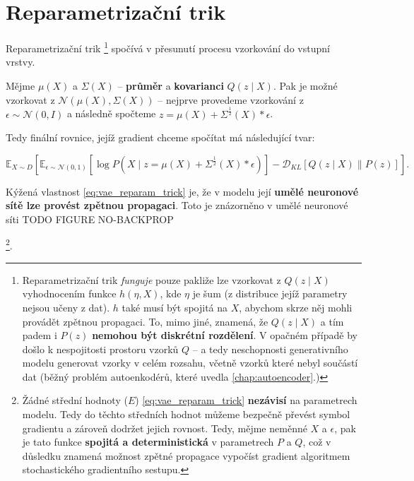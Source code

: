 \section{Reparametrizační trik}
\label{sec:reparametrization_trick}
Reparametrizační trik
\footnote{Reparametrizační trik \emph{funguje} pouze pakliže lze vzorkovat z $Q(z\mid X)$ vyhodnocením funkce $h(\eta, X)$, kde $\eta$ je šum (z distribuce jejíž parametry nejsou učeny z dat). $h$ také musí být spojitá na $X$, abychom skrze něj mohli provádět zpětnou propagaci.
To, mimo jiné, znamená, že $Q(z\mid X)$ a tím padem i $P(z)$ \textbf{nemohou být diskrétní rozdělení}. V opačném případě by došlo k nespojitosti prostoru vzorků $Q$ – a tedy neschopnosti generativního modelu generovat vzorky v celém rozsahu, včetně vzorků které nebyl součástí dat (běžný problém autoenkodérů, které uvedla \autoref{chap:autoencoder}.)}
spočívá v přesunutí procesu vzorkování do vstupní vrstvy.

Mějme $\mu(X)$ a $\Sigma(X)$ – \textbf{průměr} a \textbf{kovarianci} $Q(z\mid X)$.
Pak je možné vzorkovat z $\mathcal{N}(\mu(X), \Sigma(X))$ – nejprve provedeme vzorkování z $\epsilon \sim \mathcal{N}(0, I)$ a následně spočteme $z = \mu(X) + \Sigma^{\frac{1}{2}}(X) * \epsilon$.

Tedy finální rovnice, jejíž gradient chceme spočítat má následující tvar:

\begin{equation} \label{eq:vae_reparam_trick}
    \mathds{E}_{X \sim D} \left[ \mathds{E}_{\epsilon \sim \mathcal{N}(0, 1)} \left[ \log P(X\mid z = \mu(X) + \Sigma^{\frac{1}{2}} (X) * \epsilon) \right] - \mathcal{D}_{KL} \left[ Q (z \mid X) \parallel P(z) \right] \right].
\end{equation}

Kýžená vlastnost \autoref{eq:vae_reparam_trick} je, že v modelu její \textbf{umělé neuronové sítě lze provést zpětnou propagaci}. 
Toto je znázorněno v umělé neuronové síti TODO FIGURE NO-BACKPROP 

\footnote{Žádné střední hodnoty ($E$) \autoref{eq:vae_reparam_trick} \textbf{nezávisí} na parametrech modelu. Tedy do těchto středních hodnot můžeme bezpečně převést symbol gradientu a zároveň dodržet jejich rovnost. 
Tedy, mějme neměnné $X$ a $\epsilon$, pak je tato funkce \textbf{spojitá a deterministická} v parametrech $P$ a $Q$, což v důsledku znamená možnost zpětné propagace vypočíst gradient algoritmem stochastického gradientního sestupu. }. 

